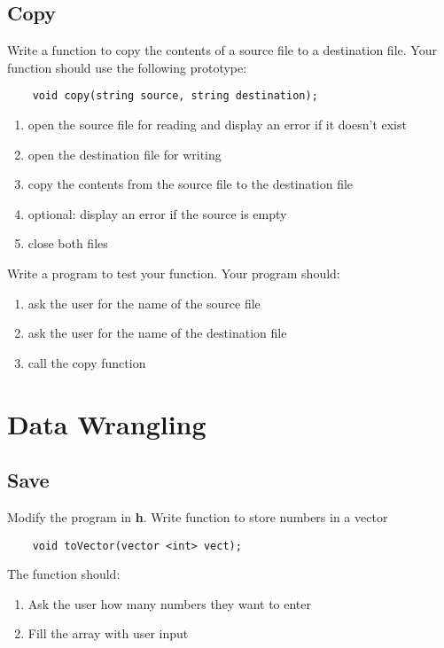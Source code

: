 \documentclass{article}
\begin{document}
\subsection{Copy}
Write a function to copy the contents of a source file to a destination file. Your function should use the following prototype:
\begin{verbatim}
	void copy(string source, string destination);
\end{verbatim}
\begin{enumerate}
	\item open the source file for reading and display an error if it doesn't exist
	\item open the destination file for writing
	\item copy the contents from the source file to the destination file
	\item optional: display an error if the source is empty
	\item close both files
\end{enumerate}
Write a program to test your function. Your program should:
\begin{enumerate}
	\item ask the user for the name of the source file 
	\item ask the user for the name of the destination file
	\item call the copy function
\end{enumerate}

\section{Data Wrangling}
\subsection{Save}
Modify the program in \textbf{h}. Write function to store numbers in a vector
\begin{verbatim}
	void toVector(vector <int> vect);
\end{verbatim}
The function should:
\begin{enumerate}
	\item Ask the user how many numbers they want to enter
	\item Fill the array with user input
\end{enumerate}
\end{document}
